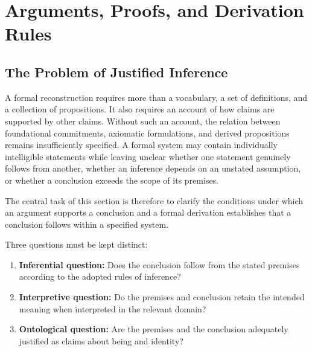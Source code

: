 
\section{Arguments, Proofs, and Derivation Rules}
\label{sec:arguments-proofs-derivation-rules}

\subsection{The Problem of Justified Inference}

A formal reconstruction requires more than a vocabulary, a set of
definitions, and a collection of propositions. It also requires an
account of how claims are supported by other claims. Without such an
account, the relation between foundational commitments, axiomatic
formulations, and derived propositions remains insufficiently
specified. A formal system may contain individually intelligible
statements while leaving unclear whether one statement genuinely
follows from another, whether an inference depends on an unstated
assumption, or whether a conclusion exceeds the scope of its premises.

The central task of this section is therefore to clarify the
conditions under which an argument supports a conclusion and a
formal derivation establishes that a conclusion follows within a
specified system.

Three questions must be kept distinct:

\begin{enumerate}
    \item \textbf{Inferential question:} Does the conclusion follow
    from the stated premises according to the adopted rules of
    inference?

    \item \textbf{Interpretive question:} Do the premises and
    conclusion retain the intended meaning when interpreted in the
    relevant domain?

    \item \textbf{Ontological question:} Are the premises and the
    conclusion adequately justified as claims about being and
    identity?
\end{enumerate}

